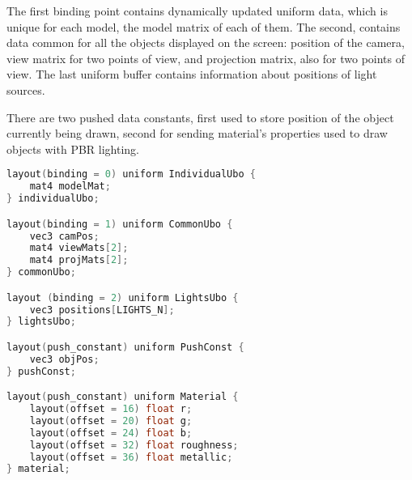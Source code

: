 The first binding point contains dynamically updated uniform data, which is unique for each model, the model matrix of each of them. The second, contains data common for all the objects displayed on the screen: position of the camera, view matrix for two points of view, and projection matrix, also for two points of view. The last uniform buffer contains information about positions of light sources.

There are two pushed data constants, first used to store position of the object currently being drawn, second for sending material's properties used to draw objects with PBR lighting.
\begin{lstlisting}[language=c++, caption=Common shader data]
layout(binding = 0) uniform IndividualUbo {
    mat4 modelMat;
} individualUbo;

layout(binding = 1) uniform CommonUbo {
    vec3 camPos;
    mat4 viewMats[2];
    mat4 projMats[2];
} commonUbo;

layout (binding = 2) uniform LightsUbo {
    vec3 positions[LIGHTS_N];
} lightsUbo;

layout(push_constant) uniform PushConst {
    vec3 objPos;
} pushConst;

layout(push_constant) uniform Material {
    layout(offset = 16) float r;
    layout(offset = 20) float g;
    layout(offset = 24) float b;
    layout(offset = 32) float roughness;
    layout(offset = 36) float metallic;
} material;
\end{lstlisting}

